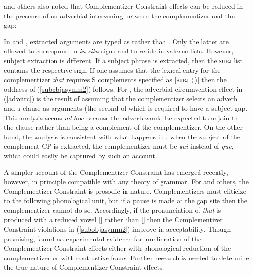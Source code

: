 \documentclass[output=paper
 	        ,biblatex
                ,babelshorthands
                ,newtxmath
                ,draftmode
                ,colorlinks, citecolor=brown
]{langscibook}
\begin{document}
\noindent
\citet{Bresnan:77}\addpages and others also noted that  Complementizer Constraint effects can be
reduced in the presence of an adverbial intervening between the complementizer and the gap:

\eal \label{advcirc}
\zl

\noindent
In \citet{bouma} and \citet[181]{ginzsag}, extracted arguments are typed as  rather
than . Only the latter are allowed to correspond to \emph{in situ} signs and to
reside in valence lists. However, subject extraction is different. If a subject phrase is extracted,
then the \textsc{subj} list contains the respective  sign. If one assumes that the
lexical entry for the complementizer \emph{that} requires S complements specified as
$[$\textsc{subj} $\langle \, \rangle]$ then the oddness of (\ref{subobjasymm2}) follows. For
\citet[181]{ginzsag}, the adverbial circumvention effect in (\ref{advcirc}) is the result of
assuming that the complementizer selects an adverb and a clause as arguments (the second of which is
required to have a subject gap. This analysis seems \emph{ad-hoc} because the adverb would be
expected to adjoin to the clause rather than being a complement of the complementizer.  On the other
hand, the analysis is consistent with what happens in : when the subject of the
complement CP is extracted, the complementizer must be {\it qui} instead of {\it que}, which could
easily be captured by such an account.

A simpler account of the Complementizer Constraint has emerged recently, however, in principle
compatible with any theory of grammar. For \citet{Kandy06,Kandy09} and others, the Complementizer
Constraint is prosodic in nature.  Complementizers must cliticize to the following phonological
unit, but if a pause is made at the gap site then the complementizer cannot do so.  Accordingly, if
the pronunciation of \emph{that} is produced with a reduced vowel [] rather than
[] then the Complementizer Constraint violations in (\ref{subobjasymm2}) improve in
acceptability. Though promising, \citet{Richart} found no experimental evidence for amelioration of
the Complementizer Constraint effects either with phonological reduction of the complementizer or
with contrastive focus. Further research is needed to determine the true nature of Complementizer
Constraint effects.
\end{document}

